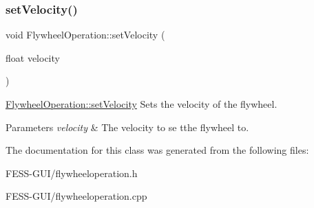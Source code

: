\subsubsection{\texorpdfstring{set\+Velocity()}{setVelocity()}}
{\footnotesize\ttfamily void Flywheel\+Operation\+::set\+Velocity (\begin{DoxyParamCaption}\item[{float}]{velocity }\end{DoxyParamCaption})}



\hyperlink{class_flywheel_operation_a30e26868333a6a7d73ae34156ba432a8}{Flywheel\+Operation\+::set\+Velocity} Sets the velocity of the flywheel. 


\begin{DoxyParams}{Parameters}
{\em velocity} & The velocity to se tthe flywheel to. \\
\hline
\end{DoxyParams}


The documentation for this class was generated from the following files\+:\begin{DoxyCompactItemize}
\item 
F\+E\+S\+S-\/\+G\+U\+I/flywheeloperation.\+h\item 
F\+E\+S\+S-\/\+G\+U\+I/flywheeloperation.\+cpp\end{DoxyCompactItemize}
